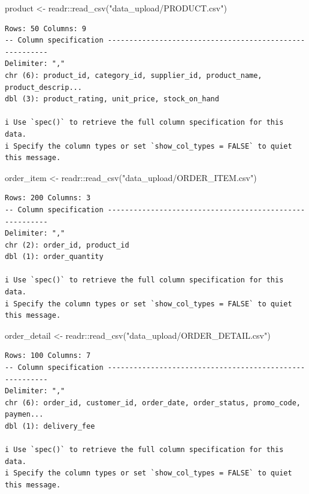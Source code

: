 \documentclass[
  letterpaper,
  DIV=11,
  numbers=noendperiod]{scrartcl}
\newenvironment{Shaded}{\begin{snugshade}}{\end{snugshade}}
\newcommand{\FunctionTok}[1]{\textcolor[rgb]{0.28,0.35,0.67}{#1}}
\newcommand{\NormalTok}[1]{\textcolor[rgb]{0.00,0.23,0.31}{#1}}
\newcommand{\OtherTok}[1]{\textcolor[rgb]{0.00,0.23,0.31}{#1}}
\newcommand{\SpecialCharTok}[1]{\textcolor[rgb]{0.37,0.37,0.37}{#1}}
\newcommand{\StringTok}[1]{\textcolor[rgb]{0.13,0.47,0.30}{#1}}
\begin{document}
\begin{Shaded}
\begin{Highlighting}[]
\NormalTok{product }\OtherTok{\textless{}{-}}\NormalTok{ readr}\SpecialCharTok{::}\FunctionTok{read\_csv}\NormalTok{(}\StringTok{"data\_upload/PRODUCT.csv"}\NormalTok{)}
\end{Highlighting}
\end{Shaded}

\begin{verbatim}
Rows: 50 Columns: 9
-- Column specification --------------------------------------------------------
Delimiter: ","
chr (6): product_id, category_id, supplier_id, product_name, product_descrip...
dbl (3): product_rating, unit_price, stock_on_hand

i Use `spec()` to retrieve the full column specification for this data.
i Specify the column types or set `show_col_types = FALSE` to quiet this message.
\end{verbatim}

\begin{Shaded}
\begin{Highlighting}[]
\NormalTok{order\_item }\OtherTok{\textless{}{-}}\NormalTok{ readr}\SpecialCharTok{::}\FunctionTok{read\_csv}\NormalTok{(}\StringTok{"data\_upload/ORDER\_ITEM.csv"}\NormalTok{)}
\end{Highlighting}
\end{Shaded}

\begin{verbatim}
Rows: 200 Columns: 3
-- Column specification --------------------------------------------------------
Delimiter: ","
chr (2): order_id, product_id
dbl (1): order_quantity

i Use `spec()` to retrieve the full column specification for this data.
i Specify the column types or set `show_col_types = FALSE` to quiet this message.
\end{verbatim}

\begin{Shaded}
\begin{Highlighting}[]
\NormalTok{order\_detail }\OtherTok{\textless{}{-}}\NormalTok{ readr}\SpecialCharTok{::}\FunctionTok{read\_csv}\NormalTok{(}\StringTok{"data\_upload/ORDER\_DETAIL.csv"}\NormalTok{)}
\end{Highlighting}
\end{Shaded}

\begin{verbatim}
Rows: 100 Columns: 7
-- Column specification --------------------------------------------------------
Delimiter: ","
chr (6): order_id, customer_id, order_date, order_status, promo_code, paymen...
dbl (1): delivery_fee

i Use `spec()` to retrieve the full column specification for this data.
i Specify the column types or set `show_col_types = FALSE` to quiet this message.
\end{verbatim}
\end{document}
